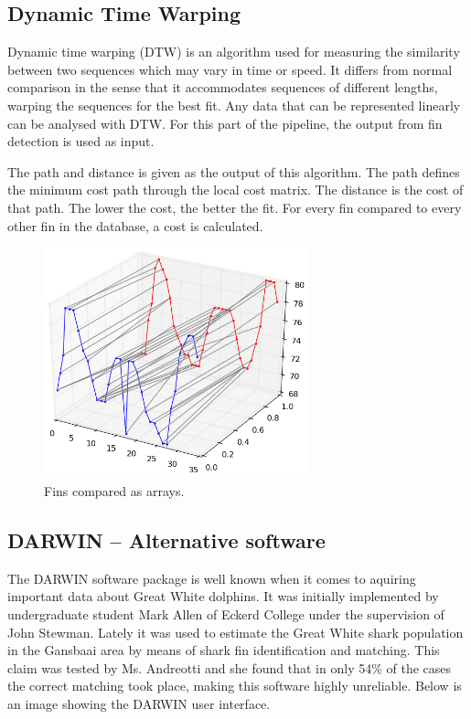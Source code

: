 \documentclass[a4paper,10pt]{article}
\begin{document}
\subsection{Dynamic Time Warping}
Dynamic time warping (DTW) is an algorithm used for measuring the similarity between two sequences which may vary in time or speed.
It differs from normal comparison in the sense that it accommodates sequences of different lengths, warping the sequences for the best fit.
Any data that can be represented linearly can be analysed with DTW.  For this part of the pipeline, the output from fin detection is used as input.

The path and distance is given as the output of this algorithm. The path defines the minimum cost path through the local cost matrix. 
The distance is the cost of that path. 
The lower the cost, the better the fit. For every fin compared to every other fin in the database, a cost is calculated.


\begin{figure}[H]
 \centering
 \includegraphics[width=3in]{dtw.jpg}
 \caption{Fins compared as arrays.}
 \label{dtw}
\end{figure}

\subsection{DARWIN -- Alternative software}
The DARWIN\cite{Darwin} software package is well known when it comes to aquiring important data about Great White dolphins.  It was initially implemented by undergraduate 
student Mark Allen of Eckerd College under the supervision of John Stewman.  Lately it was used to estimate the Great White
shark population in the Gansbaai area by means of shark fin identification and matching.  This claim was tested by Ms. Andreotti and she found that in only
54\% of the cases the correct matching took place, making this software highly
unreliable.  Below is an image showing the DARWIN user interface. 
\end{document}
